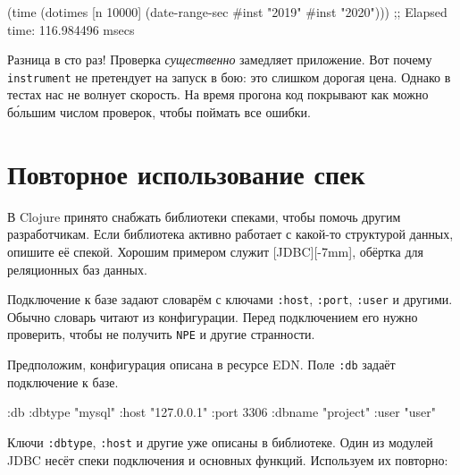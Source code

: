 \else

\begin{english}
  \begin{clojure}
(time
 (dotimes [n 10000]
   (date-range-sec #inst "2019" #inst "2020")))
;; Elapsed time: 116.984496 msecs
  \end{clojure}
\end{english}

\fi


Разница в сто раз! Проверка \emph{существенно} замедляет приложение. Вот почему
\verb|instrument| не претендует на запуск в бою: это слишком дорогая
цена. Однако в тестах нас не волнует скорость. На время прогона код покрывают
как можно б\'{о}льшим числом проверок, чтобы поймать все ошибки.

\section{Повторное использование спек}


В Clojure принято снабжать библиотеки спеками, чтобы помочь другим
разработчикам. Если библиотека активно работает с какой-то структурой данных,
опишите её спекой. Хорошим примером служит
[JDBC][-7mm], обёртка для реляционных
баз данных.

Подключение к базе задают словарём с ключами \verb|:host|, \verb|:port|,
\verb|:user| и другими. Обычно словарь читают из конфигурации. Перед
подключением его нужно проверить, чтобы не получить \verb|NPE| и другие
странности.


Предположим, конфигурация описана в ресурсе EDN. Поле \verb|:db| задаёт
подключение к базе.


\begin{english}
  \begin{clojure}
{:db {:dbtype "mysql"
      :host "127.0.0.1"
      :port 3306
      :dbname "project"
      :user "user"}}
  \end{clojure}
\end{english}

Ключи \verb|:dbtype|, \verb|:host| и другие уже описаны в библиотеке. Один
из модулей JDBC несёт спеки подключения и основных функций. Используем их
повторно:

